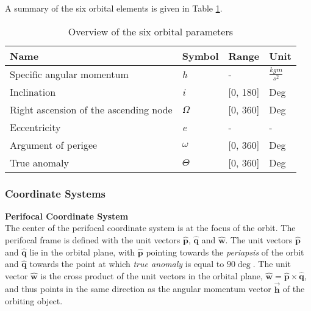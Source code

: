 A summary of the six orbital elements is given in Table \ref{table:orbital_parameters}. \\


\begin{table}[h]
\centering
\begin{tabular}{@{}llll@{}}
\toprule
Name                                  & Symbol              & Range     & Unit \\ \midrule
Specific angular momentum             & \textit{h}          & -         & $\frac{kgm}{s^2}$ \\
Inclination                           & \textit{i}          & [0, 180]  & Deg    \\
Right ascension of the ascending node & $\mathit{\Omega}$   & [0, 360]  & Deg  \\
Eccentricity                          & \textit{e}          & -         & -    \\
Argument of perigee                   & $\mathit{\omega}$   & [0, 360]  & Deg  \\
True anomaly                          & $\mathit{\Theta}$   & [0, 360]  & Deg  \\ \bottomrule
\end{tabular}
\caption{Overview of the six orbital parameters}
\label{table:orbital_parameters}
\end{table}


\subsubsection{Coordinate Systems}

\textbf{Perifocal Coordinate System} \\
The center of the perifocal coordinate system is at the focus of the orbit. The perifocal frame is defined with the unit vectors $\hat{\mathbf{p}}$, $\hat{\mathbf{q}}$ and $\hat{\mathbf{w}}$. The unit vectors $\hat{\mathbf{p}}$ and $\hat{\mathbf{q}}$ lie in the orbital plane, with $\hat{\mathbf{p}}$ pointing towards the \textit{periapsis} of the orbit and $\hat{\mathbf{q}}$ towards the point at which \textit{true anomaly} is equal to $90 \deg$. The unit vector $\hat{\mathbf{w}}$ is the cross product of the unit vectors in the orbital plane, $\hat{\mathbf{w}} = \hat{\mathbf{p}} \times \hat{\mathbf{q}}$, and thus points in the same direction as the angular momentum vector $\Vec{\mathbf{h}}$ of the orbiting object. \\

